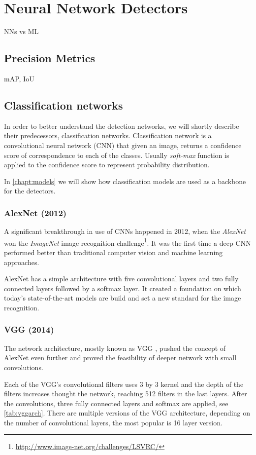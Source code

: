 \chapter{Neural Network Detectors}
NNs vs ML

\section{Precision Metrics}
mAP, IoU

\section{Classification networks}
\label{chapt:cnets}
In order to better understand the detection networks, we will shortly describe their predecessors, classification networks. Classification network is a convolutional neural network (CNN) \cite[ch.~9]{bib:dlbook} that given an image, returns a confidence score of correspondence to each of the classes. Usually \textit{soft-max} function is applied to the confidence score to represent probability distribution.

In \cref{chapt:models} we will show how classification models are used as a backbone for the detectors.

\subsection*{AlexNet (2012)}
A significant breakthrough in use of CNNs happened in 2012, when the \textit{AlexNet} \cite{bib:alexnet} won the \textit{ImageNet} image recognition challenge\footnote{\url{http://www.image-net.org/challenges/LSVRC/}}. It was the first time a deep CNN performed better than traditional computer vision and machine learning approaches. 

AlexNet has a simple architecture with five convolutional layers and two fully connected layers followed by a softmax layer. It created a foundation on which today's state-of-the-art models are build and set a new standard for the image recognition.

\subsection*{VGG (2014)}
\label{sec:VGG}
The network architecture, mostly known as VGG \cite{bib:vgg}, pushed the concept of AlexNet even further and proved the feasibility of deeper network with small convolutions. 

Each of the VGG's convolutional filters uses 3 by 3 kernel and the depth of the filters increases thought the network, reaching 512 filters in the last layers. After the convolutions, three fully connected layers and softmax are applied, see \cref{tab:vggarch}. There are multiple versions of the VGG architecture, depending on the number of convolutional layers, the most popular is 16 layer version. 

